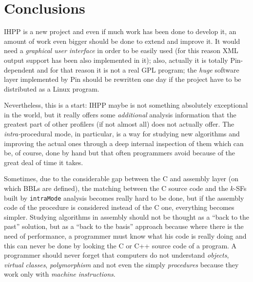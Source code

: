 \documentclass[a4paper,10pt]{report}
\begin{document}
\chapter{Conclusions}

IHPP is a new project and even if much work has been done to develop it,
an amount of work even bigger should be done to extend and improve it.
It would need a \emph{graphical user interface} in order to be easily used
(for this reason XML output support has been also implemented in it);
also, actually it is totally Pin-dependent and for that reason it is not
a real GPL program; the \emph{huge} software layer implemented by Pin should
be rewritten one day if the project have to be distributed as a Linux program.

Nevertheless, this is a start: IHPP maybe is not something absolutely exceptional
in the world, but it really offers some \emph{additional} analysis information that
the greatest part of other profilers (if not almost all) does not actually offer.
The \emph{intra-}procedural mode, in particular, is a way for studying new algorithms
and improving the actual ones through a deep internal inspection of them
which can be, of course, done by hand but that often programmers avoid because of the
great deal of time it takes.

Sometimes, due to the considerable gap between the C
and assembly layer (on which BBLs are defined),
the matching between the C source code and the $k$-SFs built by \verb|intraMode| analysis
becomes really hard to be done, but if the assembly code of the procedure is considered instead of
the C one, everything becomes simpler.
Studying algorithms in assembly should not be
thought as a ``back to the past'' solution, but as a ``back to the basis'' approach
because where there is the need of performance, a programmer must know what
his code is really doing and this can never be done
by looking the C or C++ source code of a program.
A programmer should never forget that computers do not understand
 \emph{objects}, \emph{virtual classes}, \emph{polymorphism} and not even the simply \emph{procedures} because they work only with \emph{machine instructions}.


{}

\end{document}
